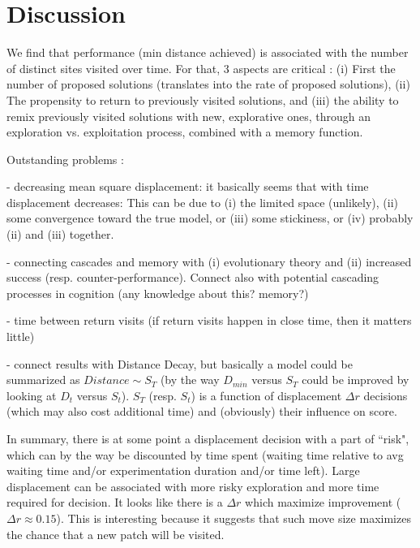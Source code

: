 \section{Discussion}
We find that performance (min distance achieved) is associated with the number of distinct sites visited over time. For that, 3 aspects are critical : (i) First the number of proposed solutions (translates into the rate of proposed solutions),  (ii) The propensity to return to previously visited solutions, and (iii) the ability to remix previously visited solutions with new, explorative ones, through an exploration vs. exploitation process, combined with a memory function.








Outstanding problems :

- decreasing mean square displacement: it basically seems that with time displacement decreases: This can be due to (i) the limited space (unlikely), (ii) some convergence toward the true model, or (iii) some stickiness, or (iv) probably (ii) and (iii) together.
  
- connecting cascades and memory with (i) evolutionary theory and (ii) increased success (resp. counter-performance). Connect also with potential cascading processes in cognition (any knowledge about this? memory?)

- time between return visits (if return visits happen in close time, then it matters little)

- connect results with Distance Decay, but basically a model could be summarized as $Distance \sim S_T$ (by the way $D_{min}$ versus $S_T$ could be improved by looking at $D_t$ versus $S_t$). $S_T$ (resp. $S_t$) is a function of displacement $\Delta r$ decisions (which may also cost additional time) and (obviously) their influence on score. 

In summary, there is at some point a displacement decision with a part of ``risk", which can by the way be discounted by time spent (waiting time relative to avg waiting time and/or experimentation duration and/or time left). Large displacement can be associated with more risky exploration and more time required for decision. It looks like there is a $\Delta r$ which maximize improvement ($\Delta r \approx 0.15$). This is interesting because it suggests that such move size maximizes the chance that a new patch will be visited.













